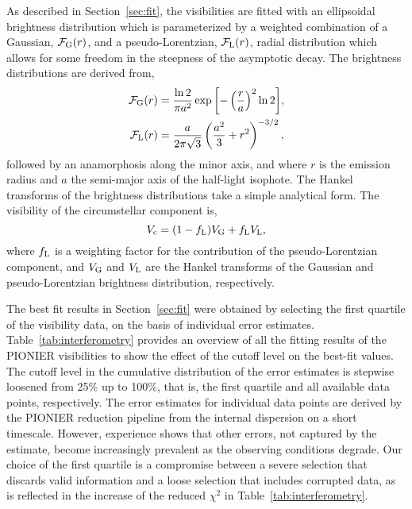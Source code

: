 \documentclass[twocolumn,tighten]{aastex61}
\begin{document}
As described in Section~\ref{sec:fit}, the visibilities are fitted with an ellipsoidal brightness distribution which is parameterized by a weighted combination of a Gaussian, $\mathcal{F}_{\rm G}(r)$, and a pseudo-Lorentzian, $\mathcal{F}_{\rm L}(r)$, radial distribution which allows for some freedom in the steepness of the asymptotic decay. The brightness distributions are derived from,
\begin{eqnarray}
\mathcal{F}_{\rm G}(r) & = \frac{\ln{2}}{\pi a^2}\exp{\left[ -\left(\frac{r}{a}\right)^2\ln{2} \right]}, \\
\mathcal{F}_{\rm L}(r) & = \frac{a}{2\pi\sqrt{3}} \left( \frac{a^2}{3} + r^2 \right)^{-3/2},
\end{eqnarray}
followed by an anamorphosis along the minor axis, and where $r$ is the emission radius and $a$ the semi-major axis of the half-light isophote. The Hankel transforms of the brightness distributions take a simple analytical form. The visibility of the circumstellar component is,
\begin{equation}
V_{\rm c} = (1 - f_{\rm L}) V_{\rm G} + f_{\rm L} V_{\rm L},
\end{equation}
where $f_{\rm L}$ is a weighting factor for the contribution of the pseudo-Lorentzian component, and $V_{\rm G}$ and $V_{\rm L}$ are the Hankel transforms of the Gaussian and pseudo-Lorentzian brightness distribution, respectively.

The best fit results in Section~\ref{sec:fit} were obtained by selecting the first quartile of the visibility data, on the basis of individual error estimates. Table~\ref{tab:interferometry} provides an overview of all the fitting results of the PIONIER visibilities to show the effect of the cutoff level on the best-fit values. The cutoff level in the cumulative distribution of the error estimates is stepwise loosened from 25\% up to 100\%, that is, the first quartile and all available data points, respectively. The error estimates for individual data points are derived by the PIONIER reduction pipeline from the internal dispersion on a short timescale. However, experience shows that other errors, not captured by the estimate, become increasingly prevalent as the observing conditions degrade. Our choice of the first quartile is a compromise between a severe selection that discards valid information and a loose selection that includes corrupted data, as is reflected in the increase of the reduced $\chi^2$ in Table~\ref{tab:interferometry}.
\end{document}
